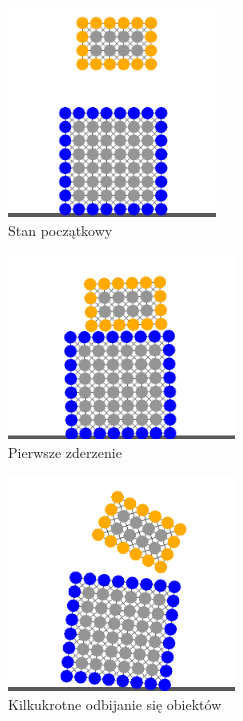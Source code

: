 \documentclass[12pt, letterpaper]{report}
\begin{document}
    \begin{figure}[H]
        \begin{subfigure}{0.5\textwidth}
            \centering
            \includegraphics[width=5.5cm]{app_correctness_01.png} 
            \caption{Stan początkowy}
        \end{subfigure}
        \begin{subfigure}{0.5\textwidth}
            \centering
            \includegraphics[width=6cm]{app_correctness_02.png}
            \caption{Pierwsze zderzenie}
        \end{subfigure}
        \begin{subfigure}{0.5\textwidth}
            \centering
            \includegraphics[width=6cm]{app_correctness_03.png}
            \caption{Kilkukrotne odbijanie się obiektów}
        \end{subfigure}
        \begin{subfigure}{0.5\textwidth}
            \centering

\end{subfigure}
\end{figure}
\end{document}
